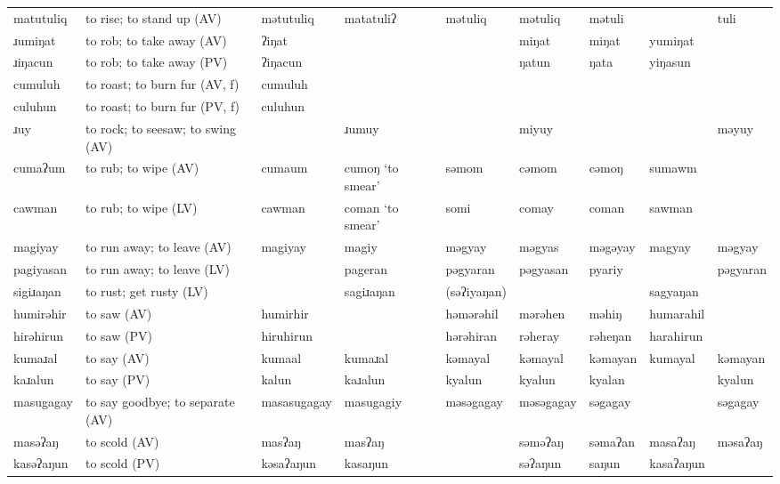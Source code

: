 \begin{landscape}
\begin{longtable}{*{9}{>{\raggedright\arraybackslash}p{}}}
\text{*}matutuliq    & to rise; to stand up (AV) & mətutuliq & matatuliʔ & mətuliq & mətuliq & mətuli &  & tuli\\
\text{*}ɹumiŋat      & to rob; to take away (AV) & ʔiŋat &  &  & miŋat & miŋat & yumiŋat & \\
\text{*}ɹiŋacun      & to rob; to take away (PV) & ʔiŋacun &  &  & ŋatun & ŋata & yiŋasun & \\
\text{*}cumuluh      & to roast; to burn fur (AV, f) & cumuluh &  &  &  &  &  & \\
\text{*}culuhun      & to roast; to burn fur (PV, f) & culuhun &  &  &  &  &  & \\
\text{*}ɹuy         & to rock; to seesaw; to swing (AV) &  & ɹumuy &  & miyuy &  &  & məyuy\\
\text{*}cumaʔum      & to rub; to wipe (AV) & cumaum & cumoŋ \newline `to smear' & səmom & cəmom & cəmoŋ & sumawm & \\
\text{*}cawman       & to rub; to wipe (LV) & cawman & coman \newline `to smear' & somi & comay & coman & sawman & \\
\text{*}magiyay      & to run away; to leave (AV) & magiyay & magiy & məgyay & məgyas & məgəyay & magyay & məgyay\\
\text{*}pagiyasan    & to run away; to leave (LV) &  & pageran & pəgyaran & pəgyasan & pyariy &  & pəgyaran\\
\text{*}sigiɹaŋan    & to rust; get rusty (LV) &  & sagiɹaŋan & (səʔiyaŋan) &  &  & sagyaŋan & \\
\text{*}humirəhir    & to saw (AV) & humirhir &  & həmərəhil & mərəhen & məhiŋ & humarahil & \\
\text{*}hirəhirun    & to saw (PV) & hiruhirun &  & hərəhiran & rəheray & rəheŋan & harahirun & \\
\text{*}kumaɹal      & to say (AV) & kumaal & kumaɹal & kəmayal & kəmayal & kəmayan & kumayal & kəmayan\\
\text{*}kaɹalun      & to say (PV) & kalun & kaɹalun & kyalun & kyalun & kyalan &  & kyalun\\
\text{*}masugagay    & to say goodbye; to separate (AV) & masasugagay & masugagiy & məsəgagay & məsəgagay & səgagay &  & səgagay\\
\text{*}masəʔaŋ      & to scold (AV) & masʔaŋ & masʔaŋ &  & səməʔaŋ & səmaʔan & masaʔaŋ & məsaʔaŋ\\
\text{*}kasəʔaŋun    & to scold (PV) & kəsaʔaŋun & kasaŋun &  & səʔaŋun & saŋun & kasaʔaŋun & \\

\end{longtable}
\end{landscape}
